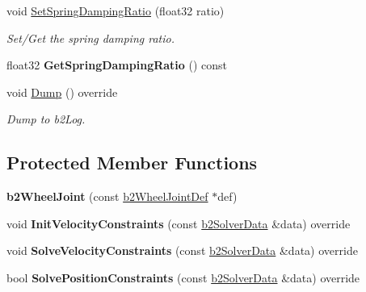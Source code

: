\begin{DoxyCompactItemize}
void \mbox{\hyperlink{classb2WheelJoint_a39b123ac045c8ec93faa65746e6655dc}{Set\+Spring\+Damping\+Ratio}} (float32 ratio)
\begin{DoxyCompactList}\small\item\em Set/\+Get the spring damping ratio. \end{DoxyCompactList}\item 
\mbox{\label{classb2WheelJoint_a18726ad5af314531f518132d6623bc61}} 
float32 {\bfseries Get\+Spring\+Damping\+Ratio} () const
\item 
\mbox{\label{classb2WheelJoint_a8295644bd733c28c8c9fa6390a367f3f}} 
void \mbox{\hyperlink{classb2WheelJoint_a8295644bd733c28c8c9fa6390a367f3f}{Dump}} () override
\begin{DoxyCompactList}\small\item\em Dump to b2\+Log. \end{DoxyCompactList}\end{DoxyCompactItemize}
\subsection*{Protected Member Functions}
\begin{DoxyCompactItemize}
\item 
\mbox{\label{classb2WheelJoint_a9c8bbb1068ddb46d074fe91802dd6a39}} 
{\bfseries b2\+Wheel\+Joint} (const \mbox{\hyperlink{structb2WheelJointDef}{b2\+Wheel\+Joint\+Def}} $\ast$def)
\item 
\mbox{\label{classb2WheelJoint_a557c58a58cdf75d5b2c14c7f75a37575}} 
void {\bfseries Init\+Velocity\+Constraints} (const \mbox{\hyperlink{structb2SolverData}{b2\+Solver\+Data}} \&data) override
\item 
\mbox{\label{classb2WheelJoint_afbda202bc67d58cac38e3c5b138b93f7}} 
void {\bfseries Solve\+Velocity\+Constraints} (const \mbox{\hyperlink{structb2SolverData}{b2\+Solver\+Data}} \&data) override
\item 
\mbox{\label{classb2WheelJoint_addbe70ee831954312bc31dee1d52311f}} 
bool {\bfseries Solve\+Position\+Constraints} (const \mbox{\hyperlink{structb2SolverData}{b2\+Solver\+Data}} \&data) override
\end{DoxyCompactItemize}
